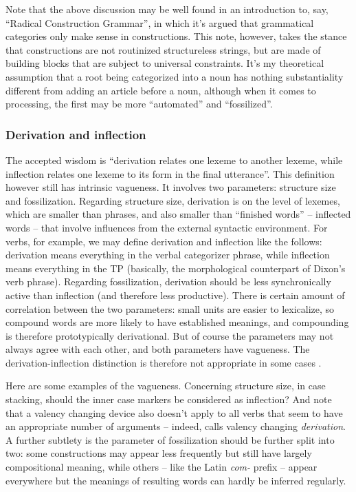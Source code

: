 \documentclass[UTF8, a4paper, oneside, scheme=plain, 12pt]{ctexbook}
\newcommand*{\citepage}[1]{p.~{#1}}
\newcommand*{\term}[1]{\emph{#1}}
\newcommand{\form}[1]{\emph{#1}}
\begin{document}
{Note that the above discussion may be well found in an introduction to, say, 
``Radical Construction Grammar'',
in which it's argued that grammatical categories only make sense 
in constructions.
This note, however, takes the stance that 
constructions are not routinized structureless strings,
but are made of building blocks that are subject to universal constraints.
It's my theoretical assumption that a root being categorized into a noun 
has nothing substantiality different from adding an article before a noun,
although when it comes to processing,
the first may be more ``automated'' and ``fossilized''.

\subsubsection{Derivation and inflection}

The accepted wisdom is ``derivation relates one lexeme to another lexeme,
while inflection relates one lexeme to its form in the final utterance''.
This definition however still has intrinsic vagueness.
It involves two parameters:
structure size
and fossilization.
Regarding structure size,
derivation is on the level of lexemes,
which are smaller than phrases,
and also smaller than ``finished words'' -- inflected words -- 
that involve influences from the external syntactic environment.
For verbs, for example, we may define derivation and inflection like the follows: 
derivation means everything in the verbal categorizer phrase,
while inflection means everything in the TP
(basically, the morphological counterpart of Dixon's verb phrase).
Regarding fossilization, 
derivation should be less synchronically active than inflection
(and therefore less productive).
There is certain amount of correlation between the two parameters:
small units are easier to lexicalize, 
so compound words are more likely to have established meanings,
and compounding is therefore prototypically derivational.
But of course the parameters may not always agree with each other,
and both parameters have vagueness.
The derivation-inflection distinction is therefore not appropriate 
in some cases \citep[\citepage{221}]{dixon2009basic1}.

Here are some examples of the vagueness.
Concerning structure size, in case stacking, 
should the inner case markers be considered as inflection?
And note that a valency changing device also doesn't apply to all verbs that seem to have 
an appropriate number of arguments --
indeed, \citet{jacques2021grammar} calls valency changing \term{derivation}.
A further subtlety is the parameter of fossilization should be further split into two:
some constructions may appear less frequently but still have largely compositional meaning,
while others -- like the Latin \form{com-} prefix -- 
appear everywhere but the meanings of resulting words
can hardly be inferred regularly.

}
\end{document}
